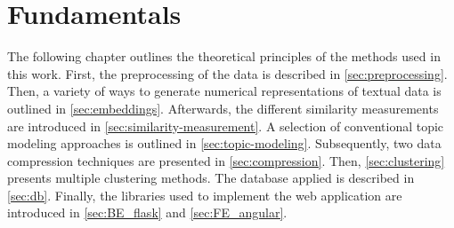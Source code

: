 \chapter{Fundamentals}\label{ch:methodology} %

The following chapter outlines the theoretical principles of the methods used in this work.
First, the preprocessing of the data is described in \autoref{sec:preprocessing}.
Then, a variety of ways to generate numerical representations of textual data is outlined in \autoref{sec:embeddings}.
Afterwards, the different similarity measurements are introduced in \autoref{sec:similarity-measurement}.
A selection of conventional topic modeling approaches is outlined in \autoref{sec:topic-modeling}.
Subsequently, two data compression techniques are presented in \autoref{sec:compression}.
Then, \autoref{sec:clustering} presents multiple clustering methods.
The database applied is described in \autoref{sec:db}.
Finally, the libraries used to implement the web application are introduced in \autoref{sec:BE_flask} and \autoref{sec:FE_angular}.


























